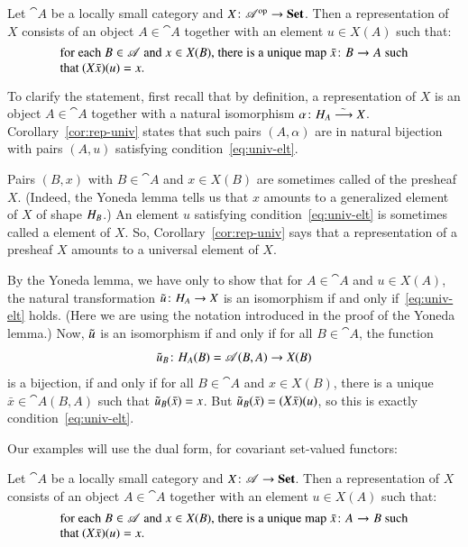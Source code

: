 \begin{cor}     
\label{cor:rep-univ}
Let $\cat{A}$ be a locally small category and $X\from \cat{A}^\op \to \Set$.
Then a representation of $X$ consists of an object $A \in \cat{A}$ together
with an element $u \in X(A)$ such that:
% 
\begin{equation}        
\label{eq:univ-elt}
\parbox{.8\textwidth}{%
for each $B \in \cat{A}$ and $x \in X(B)$, there is a unique map $\bar{x}\from
B \to A$ such that $(X\bar{x})(u) = x$.%
}
\end{equation}
% 
\end{cor}
% 
To clarify the statement, first recall that by definition, a representation
of $X$ is an object $A \in \cat{A}$ together with a natural isomorphism
$\alpha\from \h_A \toiso X$.  Corollary~\ref{cor:rep-univ} states that such
pairs $(A, \alpha)$ are in natural bijection with pairs $(A, u)$ satisfying
condition~\eqref{eq:univ-elt}.

Pairs $(B, x)$ with $B \in \cat{A}$ and $x \in X(B)$ are sometimes called
%
%
%
%
of the presheaf $X$.  (Indeed, the Yoneda lemma tells us that $x$ amounts
to a generalized element of $X$ of shape $H_B$.)  An element $u$
satisfying condition~\eqref{eq:univ-elt} is sometimes called a
%
%
%
%
element of $X$.  So, Corollary~\ref{cor:rep-univ} says that a
representation of a presheaf $X$ amounts to a universal element of $X$.

\begin{pf}
By the Yoneda lemma, we have only to show that for $A \in \cat{A}$ and $u
\in X(A)$, the natural transformation $\ynt{u}\from \h_A \to X$ is an
isomorphism if and only if~\eqref{eq:univ-elt} holds.  (Here we are using
the notation introduced in the proof of the Yoneda lemma.)  Now, $\tilde{u}$
is an isomorphism if and only if for all $B \in \cat{A}$, the function
\[
\ynt{u}_B\from \h_A(B) = \cat{A}(B, A) \to X(B)
\]
is a bijection, if and only if for all $B \in \cat{A}$ and $x \in X(B)$, there
is a unique $\bar{x} \in \cat{A}(B, A)$ such that $\tilde{u}_B(\bar{x}) = x$.
But $\tilde{u}_B(\bar{x}) = (X\bar{x})(u)$, so this is exactly
condition~\eqref{eq:univ-elt}.  
\end{pf}

Our examples will use the dual form, for covariant set-valued functors:

\begin{cor}     
\label{cor:rep-univ-dual}
Let $\cat{A}$ be a locally small category and $X\from \cat{A} \to \Set$.  Then
a representation of $X$ consists of an object $A \in \cat{A}$ together with an
element $u \in X(A)$ such that:
% 
\begin{equation}        
\label{eq:univ-elt-dual}
\parbox{.8\textwidth}{%
for each $B \in \cat{A}$ and $x \in X(B)$, there is a unique map $\bar{x}\from
A \to B$ such that $(X\bar{x})(u) = x$.%
}
\end{equation}
% 
\end{cor}

